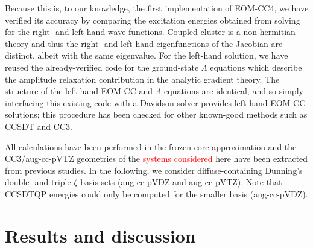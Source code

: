 \documentclass[aip,jcp,reprint,noshowkeys,superscriptaddress]{revtex4-1}
\newcommand{\alert}[1]{\textcolor{red}{#1}}
\begin{document}
Because this is, to our knowledge, the first implementation of EOM-CC4, we have verified its accuracy by comparing the excitation energies obtained from solving for the right- and left-hand wave functions. 
Coupled cluster is a non-hermitian theory and thus the right- and left-hand eigenfunctions of the Jacobian are distinct, albeit with the same eigenvalue. 
For the left-hand solution, we have reused the already-verified code for the ground-state $\Lambda$	equations which describe the amplitude relaxation contribution in the analytic gradient theory. \cite{Matthews_2021} 
The structure of the left-hand EOM-CC and $\Lambda$ equations are identical, and so simply interfacing this existing code with a Davidson solver \cite{Davidson_1975} provides left-hand EOM-CC solutions; this procedure has been checked for other known-good methods such as CCSDT and CC3.

All calculations have been performed in the frozen-core approximation and the CC3/aug-cc-pVTZ geometries of the \alert{systems considered} here have been extracted from previous studies. \cite{Loos_2018a,Chrayteh_2021}
In the following, we consider diffuse-containing Dunning's double- and triple-$\zeta$ basis sets (aug-cc-pVDZ and aug-cc-pVTZ).
Note that CCSDTQP energies could only be computed for the smaller basis (aug-cc-pVDZ).

\section{Results and discussion}
\end{document}
